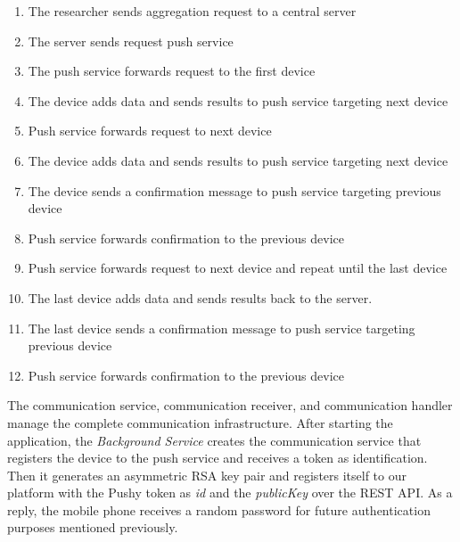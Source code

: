\begin{enumerate}
    \item The researcher sends aggregation request to a central server
    \item The server sends request push service
    \item The push service forwards request to the first device
    \item The device adds data and sends results to push service targeting next device
    \item Push service forwards request to next device
    \item The device adds data and sends results to push service targeting next device
    \item The device sends a confirmation message to push service targeting previous device
    \item Push service forwards confirmation to the previous device
    \item Push service forwards request to next device and repeat until the last device
    \item The last device adds data and sends results back to the server.
    \item The last device sends a confirmation message to push service targeting previous device
    \item Push service forwards confirmation to the previous device
\end{enumerate}

The communication service, communication receiver, and communication handler manage the complete communication infrastructure. After starting the application, the \textit{Background Service} creates the communication service that registers the device to the push service and receives a token as identification. Then it generates an asymmetric RSA key pair and registers itself to our platform with the Pushy token as \textit{id} and the \textit{publicKey} over the REST API. As a reply, the mobile phone receives a random password for future authentication purposes mentioned previously.

